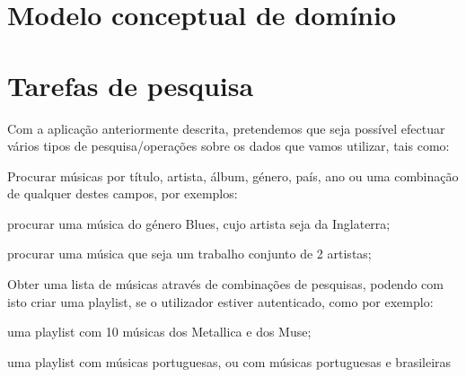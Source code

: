 \documentclass[twocolumn,twoside,11pt,a4paper]{article}
\begin{document}
\section{Modelo conceptual de domínio}\label{sec:concept_model}


\section{Tarefas de pesquisa}\label{sec:searches}

Com a aplicação anteriormente descrita, pretendemos que seja possível efectuar vários
tipos de pesquisa/operações sobre os dados que vamos utilizar, tais como:
\begin{compactitem}
  \item Procurar músicas por título, artista, álbum, género, país, ano ou uma combinação
    de qualquer destes campos, por exemplos:
    \begin{compactitem}
      \item procurar uma música do género Blues, cujo artista seja da Inglaterra;
      \item procurar uma música que seja um trabalho conjunto de 2 artistas;
    \end{compactitem}

  \item Obter uma lista de músicas através de combinações de pesquisas, podendo com
    isto criar uma playlist, se o utilizador estiver autenticado, como por exemplo:
    \begin{compactitem}
      \item uma playlist com 10 músicas dos Metallica e dos Muse;
      \item uma playlist com músicas portuguesas, ou com músicas portuguesas e brasileiras
    \end{compactitem}


\end{compactitem}
\end{document}
